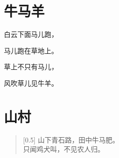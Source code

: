 \documentclass[12pt,UTF-8,openany]{ctexbook}
\begin{document}
\chapter{牛马羊}

\begin{large}
    
    白云下面马儿跑，
    
    马儿跑在草地上。
    
    草上不只有马儿，
    
    风吹草儿见牛羊。
    
\end{large}


\clearpage

\begin{center}
    
\end{center}


\hanzibox{}\hanzibox{}\hanzibox{}\hanzibox{}\hspace{1em}\hanzibox{}\hanzibox{}\hanzibox{}\hanzibox{}

\hanzibox{}\hanzibox{}\hanzibox{}\hanzibox{}\hspace{1em}\hanzibox{}\hanzibox{}\hanzibox{}\hanzibox{}

\hanzibox{}\hanzibox{}\hanzibox{}\hanzibox{}\hspace{1em}




\chapter{山村}

\begin{large}
    
    \begin{verse}[0.5\linewidth]
        山下青石路，田中牛马肥。 \\
        只闻鸡犬叫，不见农人归。
    \end{verse}
    
\end{large}


\clearpage

\begin{center}
    
    
    
\end{center}
\end{document}
